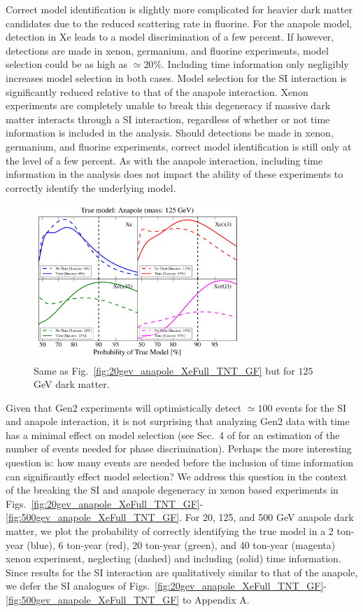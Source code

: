 \documentclass[11pt]{article}
\begin{document}
Correct model identification is slightly more complicated for heavier dark matter candidates due to the reduced scattering rate in fluorine. For the anapole model, detection in Xe leads to a model discrimination of a few percent. If however, detections are made in xenon, germanium, and fluorine experiments, model selection could be as high as $\simeq 20 \%$. Including time information only negligibly increases model selection in both cases. Model selection for the SI interaction is significantly reduced relative to that of the anapole interaction. Xenon experiments are completely unable to break this degeneracy if massive dark matter interacts through a SI interaction, regardless of whether or not time information is included in the analysis. Should detections be made in xenon, germanium, and fluorine experiments, correct model identification is still only at the level of a few percent. As with the anapole interaction, including time information in the analysis does not impact the ability of these experiments to correctly identify the underlying model. 

\begin{figure}
\centering
\includegraphics[width=0.7\textwidth]{plots/PDF_125GeV_Anapole_50sims_Xe_Xe3x_Xe10x_XeG3_GF_TNT.pdf}
\caption{\label{fig:125gev_anapole_XeFull_TNT_GF}
Same as Fig.~\ref{fig:20gev_anapole_XeFull_TNT_GF} but for $125$ GeV dark matter.}
\end{figure}

Given that Gen2 experiments will optimistically detect $\simeq 100$ events for the SI and anapole interaction, it is not surprising that analyzing Gen2 data with time has a minimal effect on model selection (see \eg Sec.~4 of \cite{DelNobile:2015nua} for an estimation of the number of events needed for phase discrimination). Perhaps the more interesting question is: how many events are needed before the inclusion of time information can significantly effect model selection? We address this question in the context of the breaking the SI and anapole degeneracy in xenon based experiments in Figs.~\ref{fig:20gev_anapole_XeFull_TNT_GF}-\ref{fig:500gev_anapole_XeFull_TNT_GF}. For 20, 125, and 500 GeV anapole dark matter, we plot the probability of correctly identifying the true model in a 2 ton-year (blue), 6 ton-year (red), 20 ton-year (green), and 40 ton-year (magenta) xenon experiment, neglecting (dashed) and including (solid) time information. Since results for the SI interaction are qualitatively similar to that of the anapole, we defer the SI analogues of Figs.~\ref{fig:20gev_anapole_XeFull_TNT_GF}-\ref{fig:500gev_anapole_XeFull_TNT_GF} to Appendix A. 
\end{document}
